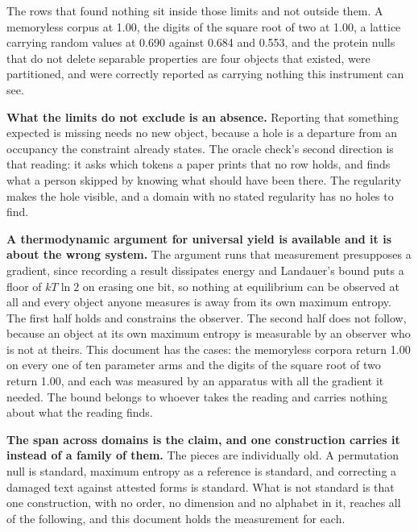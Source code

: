 The rows that found nothing sit inside those limits and not outside them. A memoryless corpus at 1.00, the digits of the square root of two at 1.00, a lattice carrying random values at 0.690 against 0.684 and 0.553, and the protein nulls that do not delete separable properties are four objects that existed, were partitioned, and were correctly reported as carrying nothing this instrument can see.

\textbf{What the limits do not exclude is an absence.} Reporting that something expected is missing needs no new object, because a hole is a departure from an occupancy the constraint already states. The oracle check's second direction is that reading: it asks which tokens a paper prints that no row holds, and finds what a person skipped by knowing what should have been there. The regularity makes the hole visible, and a domain with no stated regularity has no holes to find.

\textbf{A thermodynamic argument for universal yield is available and it is about the wrong system.} The argument runs that measurement presupposes a gradient, since recording a result dissipates energy and Landauer's bound puts a floor of \(kT\ln 2\) on erasing one bit, so nothing at equilibrium can be observed at all and every object anyone measures is away from its own maximum entropy. The first half holds and constrains the observer. The second half does not follow, because an object at its own maximum entropy is measurable by an observer who is not at theirs. This document has the cases: the memoryless corpora return 1.00 on every one of ten parameter arms and the digits of the square root of two return 1.00, and each was measured by an apparatus with all the gradient it needed. The bound belongs to whoever takes the reading and carries nothing about what the reading finds.

\textbf{The span across domains is the claim, and one construction carries it instead of a family of them.} The pieces are individually old. A permutation null is standard, maximum entropy as a reference is standard, and correcting a damaged text against attested forms is standard. What is not standard is that one construction, with no order, no dimension and no alphabet in it, reaches all of the following, and this document holds the measurement for each.

